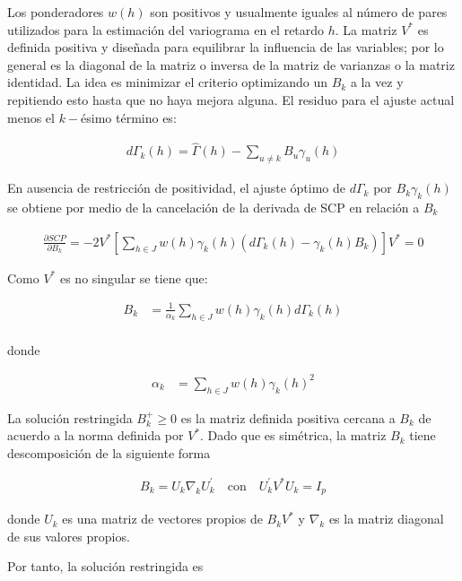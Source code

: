 \documentclass[
]{book}
\begin{document}
Los ponderadores \(w(h)\) son positivos y usualmente iguales al número de pares utilizados para la estimación del variograma en el retardo \(h\). La matriz \(V^{*}\) es definida positiva y diseñada para equilibrar la influencia de las variables; por lo general es la diagonal de la matriz o inversa de la matriz de varianzas o la matriz identidad. La idea es minimizar el criterio optimizando un \(B_k\) a la vez y repitiendo esto hasta que no haya mejora alguna. El residuo para el ajuste actual menos el \(k-\)ésimo término es:

\begin{align*}
    d\Gamma_k(h)=\hat{\Gamma}(h)-\sum_{u\neq k}B_u\gamma_u(h)
\end{align*}

En ausencia de restricción de positividad, el ajuste óptimo de \(d\Gamma_k\) por \(B_k\gamma_k(h)\) se obtiene por medio de la cancelación de la derivada de SCP en relación a \(B_k\)

\begin{align*}
    \frac{\partial SCP}{\partial B_k}=-2V^{*}\left[ \sum_{h\in J}w(h)\gamma_k(h)\left(d\Gamma_k(h)-\gamma_k(h)B_k\right)\right]V^{*}=0
\end{align*}

Como \(V^{*}\) es no singular se tiene que:

\begin{align*}
    B_k&=\frac{1}{\alpha_k}\sum_{h\in J}w(h)\gamma_k(h)d\Gamma_k(h)\\
\end{align*}

donde

\begin{align*}
    \alpha_k&=\sum_{h\in J}w(h)\gamma_k(h)^2
\end{align*}

La solución restringida \(B_k^{+} \geq 0\) es la matriz definida positiva cercana a \(B_k\) de acuerdo a la norma definida por \(V^{*}\). Dado que es simétrica, la matriz \(B_k\) tiene descomposición de la siguiente forma

\begin{align*}
    B_k=U_k\nabla_k U_k^{'}\quad \text{con} \quad U_k^{'}V^{*}U_k=I_p
\end{align*}

donde \(U_k\) es una matriz de vectores propios de \(B_kV^{*}\) y \(\nabla_k\) es la matriz diagonal de sus valores propios.

Por tanto, la solución restringida es
\end{document}

